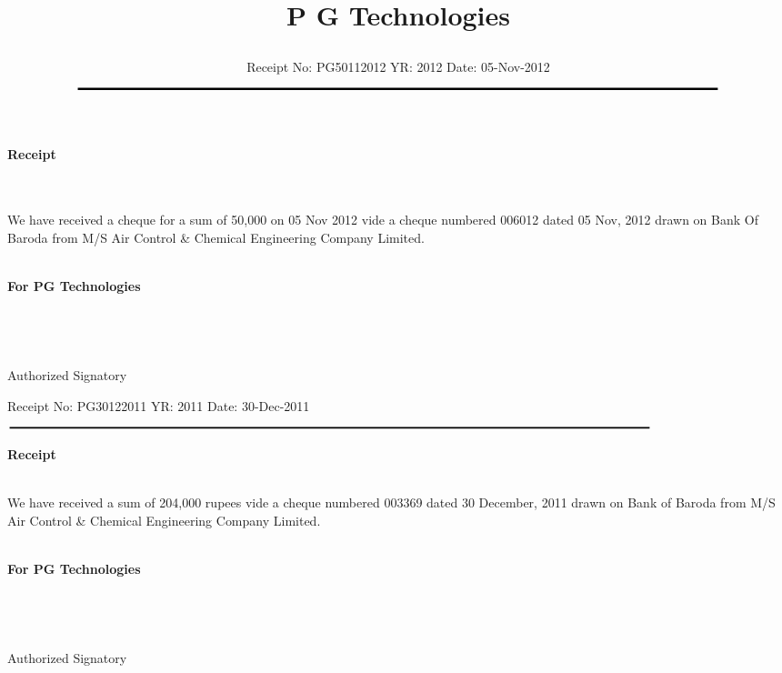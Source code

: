 \documentclass[11pt]{article}
\title{\vspace*{-1.5cm} \centerline{ {\Huge{ \bf \hspace{0cm} P G Technologies}\vspace*{-0.75cm}}}}
\author{
 \scriptsize Receipt No: PG50112012  \hspace*{4cm}   YR: 2012 \hspace*{4cm} Date: 05-Nov-2012\\
$\rule{7.0in}{0.5mm}$}
\date{}
\begin{document}
\maketitle
\thispagestyle{empty}
\vspace*{-0.5cm}	
\large{
\centerline{ \Huge \bf  Receipt}  
\  \\ \\

We have received a cheque for  a sum of 50,000 on 05 Nov 2012 vide  a cheque numbered  006012 dated 05 Nov, 2012 drawn on Bank Of Baroda from M/S Air Control \& Chemical Engineering Company Limited.  \\  \\

} 
{\bf For  PG Technologies } \\ \\ \\ \\ \\
 \hspace*{0.6cm}Authorized Signatory


\vspace*{20pt}

\hspace*{-3cm}\hdashrule[0.5ex]{25cm}{1pt}{3mm}
\vspace*{20pt}




{
}

{{\scriptsize Receipt No: PG30122011  \hspace*{4cm}   YR: 2011 \hspace*{4cm} Date: 30-Dec-2011\\
$\rule{7.0in}{0.5mm}$}\\

\centerline{ \vspace*{30pt}\Huge \bf  Receipt}  
\  \\ 

We have received a sum of 204,000 rupees vide  a cheque numbered  003369 dated  30 December, 2011  drawn on Bank of Baroda  from  M/S Air Control \& Chemical Engineering Company Limited.  \\  \\

} 
{\bf For  PG Technologies } \\ \\ \\ \\ \\
 \hspace*{0.6cm}Authorized Signatory
\vspace*{-72pt}
\end{document}
